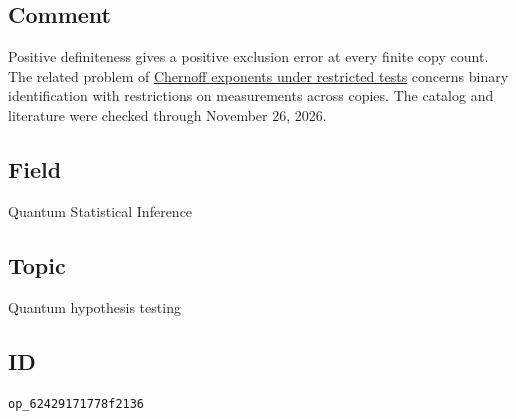 \subsection*{Comment}

Positive definiteness gives a positive exclusion error at every finite copy count. The related problem of \href{https://qiqc-op.com/problem/op_a370855db65d4d24/}{Chernoff exponents under restricted tests} concerns binary identification with restrictions on measurements across copies. The catalog and literature were checked through November 26, 2026.

\subsection*{Field}

Quantum Statistical Inference

\subsection*{Topic}

Quantum hypothesis testing

\subsection*{ID}

\texttt{op\_62429171778f2136}
